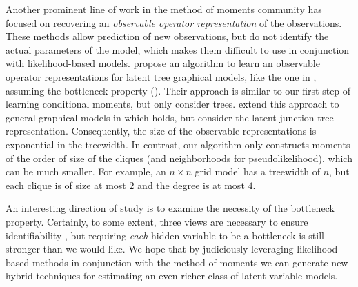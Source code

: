 Another prominent line of work in the method of moments community has
  focused on recovering an {\em observable operator
  representation} of the observations.
  These methods allow prediction of new observations, but do not
  identify the actual parameters of the model, which makes them difficult to use
  in conjunction with likelihood-based models. %
\citet{song2011spectral} propose an algorithm to learn an observable
  operator representations for latent tree graphical models, like the
  one in , assuming the bottleneck property (). 
Their approach is similar to our first step of learning conditional moments,
  but only consider trees.
\citet{parikh12spectral} extend this approach to general graphical
  models in which  holds, but consider the latent
  junction tree representation. 
  Consequently, the size of the observable representations is exponential in
  the treewidth.
  In contrast, our algorithm only constructs moments of the order of size of the cliques
  (and neighborhoods for pseudolikelihood), which can be much smaller.
For example, an $n\times n$ grid model has a treewidth of $n$, but each
  clique is of size at most $2$ and the degree is at most $4$.

An interesting direction of study is to examine the necessity of the bottleneck
property.  Certainly, to some extent, three views are necessary to ensure
identifiability \cite{kruskal77three}, but requiring \emph{each} hidden variable to be
a bottleneck is still stronger than we would like.  We hope that by judiciously
leveraging likelihood-based methods in conjunction with the method of moments
we can generate new hybrid techniques for estimating
an even richer class of latent-variable models.

